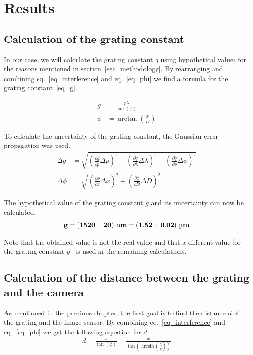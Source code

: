 \section{Results}\label{sec_results}

\subsection{Calculation of the grating constant}

In our case, we will calculate the grating constant $g$ using hypothetical values for the reasons mentioned in section~\ref{sec_methodology}.
By rearranging and combining eq.~\ref{eq_interference} and eq.~\ref{eq_phi} we find a formula for the grating constant~\ref{eq_g}.

\begin{align}
    g &= \frac{p \lambda}{\sin(\phi)} \label{eq_g}\\
    \phi &= \arctan \left( \frac{x}{D} \right)
\end{align}

To calculate the uncertainty of the grating constant, the Gaussian error propagation was used.
\begin{align}
    \Delta g &= \sqrt{{\left( \frac{\partial g}{\partial p} \Delta p \right)}^2 + {\left( \frac{\partial g}{\partial \lambda} \Delta \lambda \right)}^2 + {\left( \frac{\partial g}{\partial \phi} \Delta \phi \right)}^2}\\
    \Delta \phi &= \sqrt{{\left( \frac{\partial \phi}{\partial x} \Delta x \right)}^2 + {\left( \frac{\partial \phi}{\partial D} \Delta D \right)}^2}
\end{align}

The hypothetical value of the grating constant $g$ and its uncertainty can now be calculated:
\begin{align}
    \bf g = (1520 \pm 20) ~\si{\bf\nano\meter} = (1.52 \pm 0.02) ~\si{\bf\micro\meter} \label{res_g}
\end{align}

Note that the obtained value is not the real value and that a different value for the grating constant $g$~\cite{src_grating_constant} is used in the remaining calculations.

\subsection{Calculation of the distance between the grating and the camera}

As mentioned in the previous chapter, the first goal is to find the distance $d$ of the grating
and the image sensor.
By combining eq.~\ref{eq_interference} and eq.~\ref{eq_phi} we get the following equation for $d$:
\begin{align}
    d = \frac{x}{\tan(\phi)} = \frac{x}{\tan(\arcsin(\frac{\lambda}{g}))} \label{eq_distance}
\end{align}

